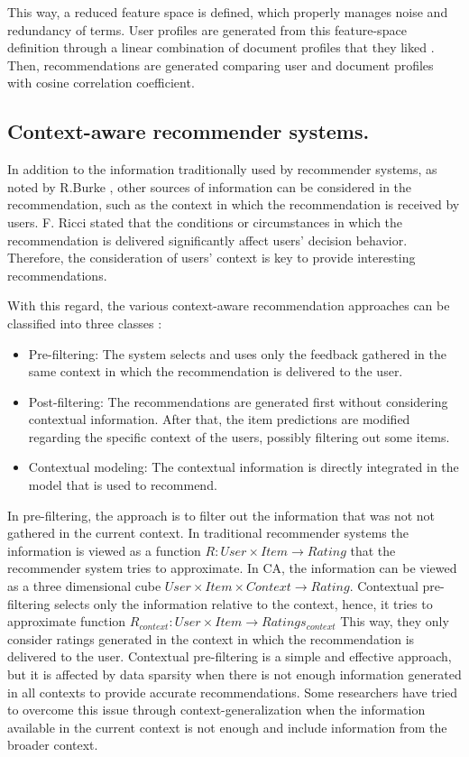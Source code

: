 \documentclass[preprint]{elsarticle}
\begin{document}
\begin{spacing}{1.5}
This way, a reduced feature space is defined, which properly manages noise and redundancy of terms. User profiles are generated from this feature-space definition through a linear combination of document profiles that they liked \cite{Bambini2011}. Then, recommendations are generated comparing user and document profiles with cosine correlation coefficient.

\subsection{Context-aware recommender systems.}

In addition to the information traditionally used by recommender systems, as noted by R.Burke \cite{Burke2002}, other sources of information can be considered in the recommendation, such as the context in which the recommendation is received by users. F. Ricci \cite{Ricci2012contextualizing} stated that the conditions or circumstances in which the recommendation is delivered significantly affect users' decision behavior. Therefore, the consideration of users' context is key to provide interesting recommendations.

With this regard, the various context-aware recommendation approaches can be classified into three classes \cite{Adomavicius2011}:
\begin{itemize}
	\item Pre-filtering: The system selects and uses only the feedback gathered in the same context in which the recommendation is delivered to the user.
	\item Post-filtering: The recommendations are generated first without considering contextual information. After that, the item predictions are modified regarding the specific context of the users, possibly filtering out some items.
	\item Contextual modeling: The contextual information is directly integrated in the model that is used to recommend.
\end{itemize}

In pre-filtering, the approach is to filter out the information that was not not gathered in the current context. In traditional recommender systems the information is viewed as a function $R: User \times Item \rightarrow Rating $ that the recommender system tries to approximate. In CA, the information can be viewed as a three dimensional cube $User \times Item \times Context \rightarrow Rating$. Contextual pre-filtering selects only the information relative to the context, hence, it tries to approximate function $R_{context}: User \times Item \rightarrow Ratings_{context}$ This way, they only consider ratings generated in the context in which the recommendation is delivered to the user. Contextual pre-filtering is a simple and effective approach, but it is affected by data sparsity when there is not enough information generated in all contexts to provide accurate recommendations. Some researchers have tried to overcome this issue through context-generalization \cite{Adomavicius2011} when the information available in the current context is not enough and include information from the broader context.


\end{spacing}
\end{document}
